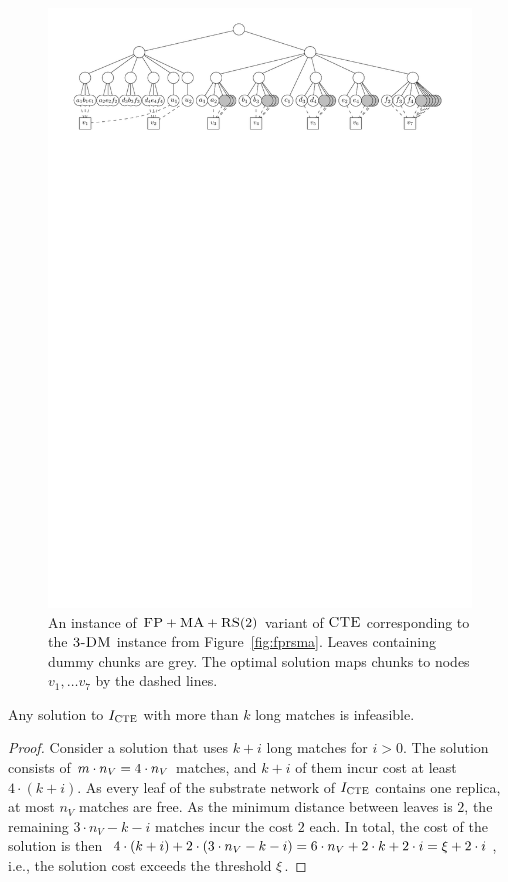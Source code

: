 \begin{figure}[t]
\centering
\includegraphics[width=1\columnwidth]{figs/static-mapping/cte-ma2.pdf}
\caption{An instance of $\textsc{FP}+\textsc{MA}+\textsc{RS}(2)$ variant of $\textsc{CTE}$ corresponding to the $\textsc{3-DM}$ instance from Figure~\ref{fig:fprsma}. Leaves containing dummy chunks are grey. The optimal solution maps chunks to nodes $v_1, \ldots v_7$ by the dashed lines.}\label{fig:overview}
\end{figure}


  \begin{lemma}
    Any solution to $I_{\mathrm{\textsc{CTE}}}$ with more than $k$ long matches is infeasible.
    \label{lem:infeasible}
  \end{lemma}
  \begin{proof}
    Consider a solution that uses $k+i$ long matches for $i>0$.
    The solution consists of $m \cdot n_V = 4\cdot n_V$ matches, and $k+i$ of them incur cost at least $4\cdot (k+i)$.
    As every leaf of the substrate network of $I_{\mathrm{\textsc{CTE}}}$ contains one replica, at most $n_V$ matches are free.
    As the minimum distance between leaves is $2$, the remaining $3\cdot n_V - k-i$ matches incur the cost $2$ each.
    In total, the cost of the solution is then $4\cdot (k+i) + 2\cdot (3\cdot n_V - k-i) = 6\cdot n_V + 2\cdot k + 2\cdot i = \xi + 2\cdot i$, i.e., the solution cost exceeds the threshold $\xi$.
  \end{proof}

